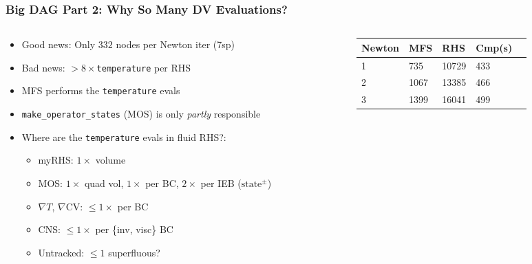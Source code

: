 \begin{frame}\frametitle{Big DAG Part 2: Why So Many DV Evaluations?}
\begin{columns}[T, onlytextwidth] %
    \begin{column}{0.48\textwidth}
        \begin{itemize}
          \item Good news: Only $332$ nodes per Newton iter (7sp)
          \item Bad news: $>8\times$\texttt{temperature} per RHS
          \item MFS performs the \texttt{temperature} evals
          \item \texttt{make\_operator\_states} (MOS) is only \textit{partly} responsible
          \item Where are the \texttt{temperature} evals in fluid RHS?:
          \begin{itemize}
          \item myRHS: $1\times$ volume
          \item MOS: $1\times$ quad vol, $1\times$ per BC, $2\times$ per IEB ($\text{state}^{\pm}$)
          \item $\nabla{T}$, $\nabla{\text{CV}}$: $\le1\times$ per BC
          \item CNS: $\le1\times$ per \{inv, visc\} BC
          \item Untracked: $\le1$ superfluous?
          \end{itemize}
        \end{itemize}
    \end{column}

    \begin{column}{0.48\textwidth}
        \centering
        \begin{tabularx}{\textwidth}{|X|X|X|X|X|}
            \hline
            \textbf{Newton} & \textbf{MFS} & \textbf{RHS} & \textbf{Cmp(s)} \\ \hline
            1 & 735 & 10729 & 433 \\ \hline
            2 & 1067 & 13385 & 466 \\ \hline
            3 & 1399 & 16041 & 499 \\ \hline
        \end{tabularx}        
    \end{column}
\end{columns}

\end{frame}

